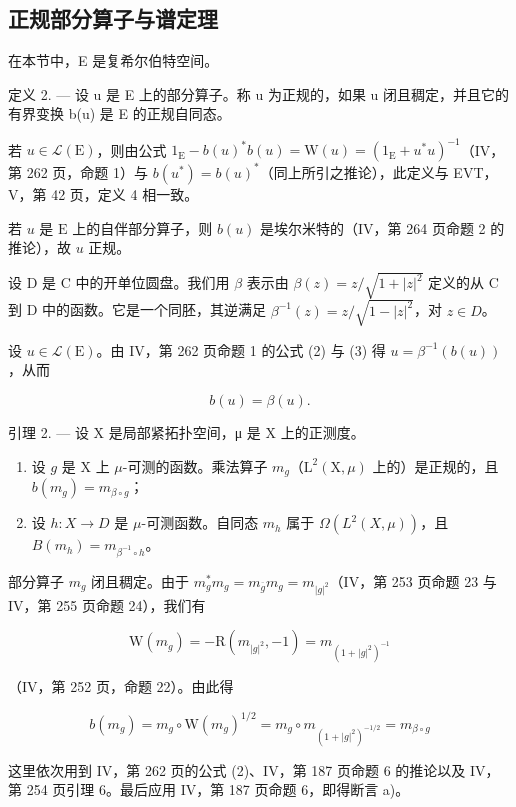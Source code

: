 \subsection{正规部分算子与谱定理}

在本节中，E 是复希尔伯特空间。

定义 2. --- 设 u 是 E 上的部分算子。称 u 为正规的，如果 u 闭且稠定，并且它的有界变换 b(u) 是 E 的正规自同态。

若 \(u \in \mathcal{L}(\mathrm{E})\)，则由公式 \(1_{\mathrm{E}} - b(u)^{*}b(u) = \mathrm{W}(u) = (1_{\mathrm{E}} + u^{*}u)^{-1}\)（IV，第 262 页，命题 1）与 \(b(u^{*}) = b(u)^{*}\)（同上所引之推论），此定义与 EVT，V，第 42 页，定义 4 相一致。

若 \(u\) 是 \(\mathrm{E}\) 上的自伴部分算子，则 \(b(u)\) 是埃尔米特的（IV，第 264 页命题 2 的推论），故 \(u\) 正规。

设 D 是 C 中的开单位圆盘。我们用 \(\beta\) 表示由 \(\beta(z)=z/\sqrt{1+|z|^{2}}\) 定义的从 C 到 D 中的函数。它是一个同胚，其逆满足 \(\beta^{-1}(z)=z/\sqrt{1-|z|^{2}}\)，对 \(z\in D\)。

设 \(u \in \mathcal{L}(\mathrm{E})\)。由 IV，第 262 页命题 1 的公式 (2) 与 (3) 得 \(u = \beta^{-1}(b(u))\)，从而

\[
b (u) = \beta (u).\tag{5}
\]

引理 2. --- 设 X 是局部紧拓扑空间，μ 是 X 上的正测度。

\begin{enumerate}
\def\labelenumi{\alph{enumi})}
\item
  设 \(g\) 是 X 上 \(\mu\)-可测的函数。乘法算子 \(m_g\)（\(\mathrm{L}^2 (\mathrm{X},\mu)\) 上的）是正规的，且 \(b(m_g) = m_{\beta \circ g}\)；
\item
  设 \(h\colon X\to D\) 是 \(\mu\)-可测函数。自同态 \(m_h\) 属于 \(\Omega(L^2(X,\mu))\)，且 \(B(m_h)=m_{\beta^{-1}\circ h}\)。
\end{enumerate}

部分算子 \(m_g\) 闭且稠定。由于 \(m_g^* m_g = m_{\overline{g}} m_g = m_{|g|^2}\)（IV，第 253 页命题 23 与 IV，第 255 页命题 24），我们有

\[
\mathrm{W} (m _ {g}) = - \mathrm{R} (m _ {| g | ^ {2}}, - 1) = m _ {(1 + | g | ^ {2}) ^ {- 1}}
\]

（IV，第 252 页，命题 22）。由此得

\[
b (m _ {g}) = m _ {g} \circ \mathrm{W} (m _ {g}) ^ {1 / 2} = m _ {g} \circ m _ {(1 + | g | ^ {2}) ^ {- 1 / 2}} = m _ {\beta \circ g}
\]

这里依次用到 IV，第 262 页的公式 (2)、IV，第 187 页命题 6 的推论以及 IV，第 254 页引理 6。最后应用 IV，第 187 页命题 6，即得断言 a)。

